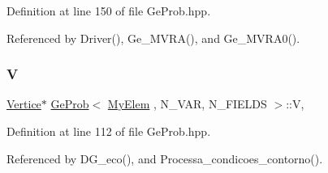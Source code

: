Definition at line 150 of file Ge\+Prob.\+hpp.



Referenced by Driver(), Ge\+\_\+\+M\+V\+R\+A(), and Ge\+\_\+\+M\+V\+R\+A0().

\mbox{\label{classGeProb_aaa26398869b601604a4a5f3032c46070}} 
\subsubsection{\texorpdfstring{V}{V}}
{\footnotesize\ttfamily \hyperlink{structVertice}{Vertice}$\ast$ \hyperlink{classGeProb}{Ge\+Prob}$<$ \hyperlink{DG__Prob_8h_a83cd887ced9a6587428f267e50cd4787}{My\+Elem} , N\+\_\+\+V\+AR, N\+\_\+\+F\+I\+E\+L\+DS $>$\+::V\hspace{0.3cm}{\ttfamily [protected]}, {\ttfamily [inherited]}}



Definition at line 112 of file Ge\+Prob.\+hpp.



Referenced by D\+G\+\_\+eco(), and Processa\+\_\+condicoes\+\_\+contorno().



